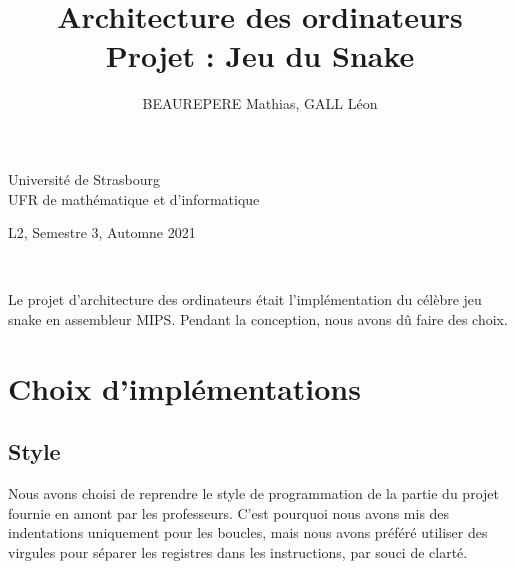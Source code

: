 \documentclass[a4paper]{article}
\title{Architecture des ordinateurs\\\large Projet : Jeu du Snake}
\author{BEAUREPERE Mathias, GALL Léon}
\date{}
\begin{document}
\hspace{-0.5cm}\begin{minipage}{0.5\textwidth}
Université de Strasbourg\\
UFR de mathématique et d'informatique
\end{minipage}
\hspace*{\fill}\begin{minipage}{0.5\textwidth}
\hspace*{\fill}L2, Semestre 3, Automne 2021\\
\hspace*{\fill}\@author
\end{minipage}
\\
\begin{center}
  \huge \@title
\end{center}
\vspace*{1cm}


Le projet d'architecture des ordinateurs était l'implémentation du célèbre jeu snake en assembleur MIPS.
Pendant la conception, nous avons dû faire des choix.

\section{Choix d'implémentations}

\subsection{Style}
Nous avons choisi  de reprendre le style de programmation de la partie du projet fournie en amont par les professeurs.
C'est pourquoi nous avons mis des indentations uniquement pour les boucles, mais nous avons préféré utiliser des virgules
pour séparer les registres dans les instructions, par souci de clarté.
\end{document}
